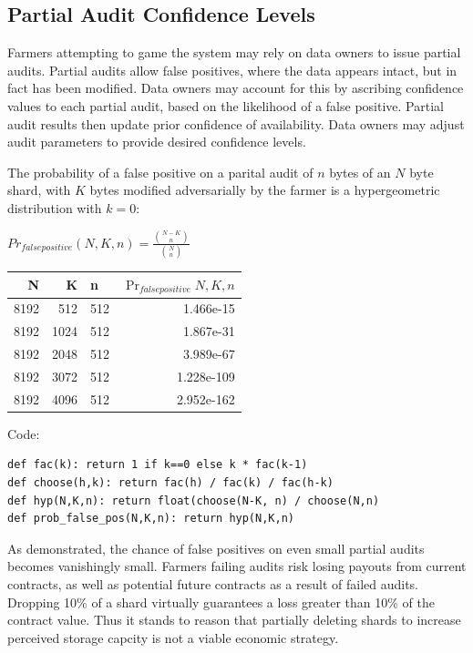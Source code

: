 \documentclass[a4paper,10pt]{article}
\begin{document}
\subsection{Partial Audit Confidence Levels}
Farmers attempting to game the system may rely on data owners to issue partial audits. Partial audits allow false positives, where the data appears intact, but in fact has been modified. Data owners may account for this by ascribing confidence values to each partial audit, based on the likelihood of a false positive. Partial audit results then update prior confidence of availability. Data owners may adjust audit parameters to provide desired confidence levels.

The probability of a false positive on a parital audit of $ n $ bytes of an $ N $ byte shard, with $ K $ bytes modified adversarially by the farmer is a hypergeometric distribution with $ k = 0 $:

{\centering
$Pr_{false positive}(N,K,n) = \displaystyle \frac{{N-K \choose n}} {{N \choose n}}$
\\}

\begin{table}[hbt!]
\begin{center}
\begin{tabular}{r r l r}
N & K & n & $\Pr_{falsepositive}{N,K,n}$\\
\hline 8192 & 512  & 512 & 1.466e-15\\
\hline 8192 & 1024 & 512 & 1.867e-31\\
\hline 8192 & 2048 & 512 & 3.989e-67\\
\hline 8192 & 3072 & 512 & 1.228e-109\\
\hline 8192 & 4096 & 512 & 2.952e-162\\
\end{tabular}
\end{center}
\end{table}

Code:
\begin{lstlisting}
def fac(k): return 1 if k==0 else k * fac(k-1)
def choose(h,k): return fac(h) / fac(k) / fac(h-k)
def hyp(N,K,n): return float(choose(N-K, n) / choose(N,n)
def prob_false_pos(N,K,n): return hyp(N,K,n)
\end{lstlisting}

As demonstrated, the chance of false positives on even small partial audits becomes vanishingly small. Farmers failing audits risk losing payouts from current contracts, as well as potential future contracts as a result of failed audits. Dropping 10\% of a shard virtually guarantees a loss greater than 10\% of the contract value. Thus it stands to reason that partially deleting shards to increase perceived storage capcity is not a viable economic strategy.
\end{document}
